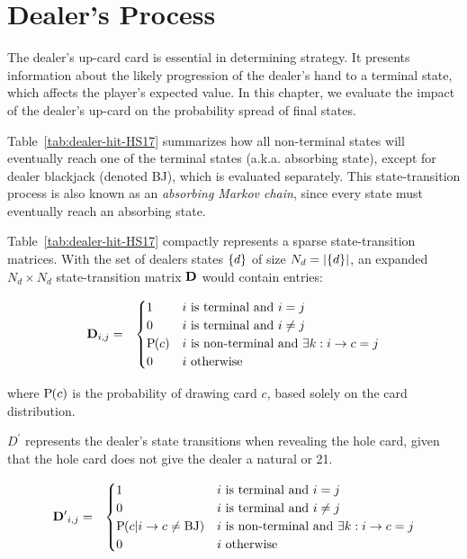 
\chapter{Dealer's Process}
\label{sec:dealer}

The dealer's up-card card is essential in determining strategy.
It presents information about the likely progression of the dealer's
hand to a terminal state, which affects the player's expected value.
In this chapter, we evaluate the impact of the dealer's up-card
on the probability spread of final states.  

Table~\ref{tab:dealer-hit-HS17}
summarizes how all non-terminal states will eventually reach
one of the terminal states (a.k.a. absorbing state), 
except for dealer blackjack (denoted BJ), 
which is evaluated separately.
This state-transition process is also known as an
\emph{absorbing Markov chain},
since every state must eventually reach an absorbing state.

Table~\ref{tab:dealer-hit-HS17}
compactly represents a sparse state-transition matrices.
With the set of dealers states $\left\{d\right\}$ of size $N_d=\left|\left\{d\right\}\right|$,
an expanded $N_d \times N_d$ state-transition matrix $\mathbf{D}$ 
would contain entries:

\begin{eqnarray}
\mathbf{D}_{i,j} &=&
\begin{cases}
1 & i~\text{is terminal and } i=j \\
0 & i~\text{is terminal and } i\neq{}j \\
\textrm{P}\hspace{-.5ex}\left(c\right) & i~\text{is non-terminal and } \exists k : i\rightarrow{}c = j \\
0 & i~\text{otherwise}
\end{cases}
\end{eqnarray}

\noindent
where $\textrm{P}\hspace{-.5ex}\left(c\right)$ is the probability of drawing card $c$,
based solely on the card distribution.

$D^\prime$ represents the dealer's state transitions
when revealing the hole card,
given that the hole card does not give the dealer a natural or 21.

\begin{eqnarray}
\mathbf{D^\prime}_{i,j} &=&
\begin{cases}
1 & i~\text{is terminal and } i=j \\
0 & i~\text{is terminal and } i\neq{}j \\
\textrm{P}\hspace{-.5ex}\left(c|i\rightarrow{}c\neq{}\text{BJ}\right) &
  i~\text{is non-terminal and } \exists k : i\rightarrow{}c = j \\
0 & i~\text{otherwise}
\end{cases}
\end{eqnarray}

